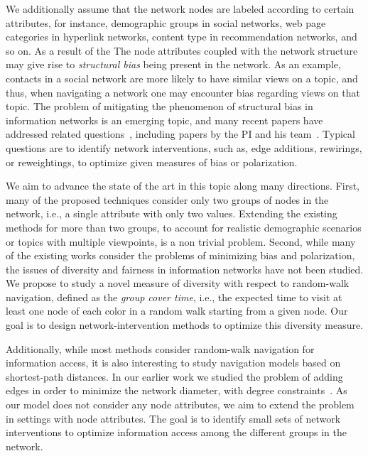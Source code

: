 \documentclass[a4paper,11pt]{article}
\begin{document}
We additionally assume that the network nodes are labeled according to certain attributes, 
for instance, demographic groups in social networks, 
web page categories in hyperlink networks, 
content type in recommendation networks, and so on.
As a result of the 
The node attributes coupled with the network structure may give rise to 
\emph{structural bias} being present in the network.
As an example, contacts in a social network are more likely to have similar views on a topic, 
and thus, when navigating a network one may encounter bias regarding views on that topic.
The problem of mitigating the phenomenon of structural bias in information networks is an emerging topic, 
and many recent papers have addressed related questions~\cite{fabbri2022rewiring,haddadan2022reducing}, 
including papers by the PI and his 
team~\cite{adriaens2022diameter,adriaens2023minimizing,cinus2023rebalancing,coupette2023reducing}.
Typical questions are to identify network interventions, 
such as, edge additions, re\-wirings, or re\-weightings, 
to optimize given measures of bias or polarization.

We aim to advance the state of the art in this topic
along many directions. 
First, many of the proposed techniques consider only two groups of nodes in the network, 
i.e., a single attribute with only two values.
Extending the existing methods for more than two groups, 
to account for realistic demographic scenarios or topics with multiple viewpoints, 
is a non trivial problem.
Second, while many of the existing works consider the problems of minimizing bias and polarization, 
the issues of diversity and fairness in information networks have not been studied.  
We propose to study a novel measure of diversity with respect to random-walk navigation, 
defined as the \emph{group cover time}, i.e., 
the expected time to visit at least one node of each color
in a random walk starting from a given node.
Our goal is to design network-intervention methods to 
optimize this diversity measure.

Additionally, while most methods consider random-walk navigation for information access, 
it is also interesting to study navigation models based on shortest-path distances. 
In our earlier work we studied the problem of adding edges in order to minimize the network diameter, 
with degree constraints~\cite{adriaens2022diameter}.
As our model does not consider any node attributes, 
we aim to extend the problem in settings with node attributes. 
The goal is to identify small sets of network interventions
to optimize information access among the different groups in the network.
\end{document}
